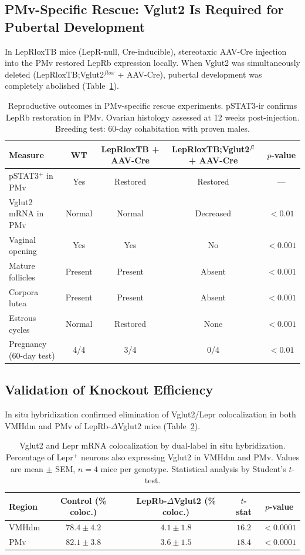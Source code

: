\documentclass[11pt]{article}
\begin{document}
\subsection{PMv-Specific Rescue: Vglut2 Is Required for Pubertal Development}

In LepRloxTB mice (LepR-null, Cre-inducible), stereotaxic AAV-Cre injection into the PMv restored LepRb expression locally. When Vglut2 was simultaneously deleted (LepRloxTB;Vglut2$^{flox}$ + AAV-Cre), pubertal development was completely abolished (Table~\ref{tab:rescue}).

\begin{table}[H]
\centering
\caption{Reproductive outcomes in PMv-specific rescue experiments. pSTAT3-ir confirms LepRb restoration in PMv. Ovarian histology assessed at 12 weeks post-injection. Breeding test: 60-day cohabitation with proven males.}
\label{tab:rescue}
\begin{tabular}{lcccc}
\toprule
\textbf{Measure} & \textbf{WT} & \textbf{LepRloxTB + AAV-Cre} & \textbf{LepRloxTB;Vglut2$^{fl}$ + AAV-Cre} & \textbf{$p$-value} \\
\midrule
pSTAT3$^+$ in PMv & Yes & Restored & Restored & --- \\
Vglut2 mRNA in PMv & Normal & Normal & Decreased & $< 0.01$ \\
Vaginal opening & Yes & Yes & No & $< 0.001$ \\
Mature follicles & Present & Present & Absent & $< 0.001$ \\
Corpora lutea & Present & Present & Absent & $< 0.001$ \\
Estrous cycles & Normal & Restored & None & $< 0.001$ \\
Pregnancy (60-day test) & 4/4 & 3/4 & 0/4 & $< 0.01$ \\
\bottomrule
\end{tabular}
\end{table}

\subsection{Validation of Knockout Efficiency}

In situ hybridization confirmed elimination of Vglut2/Lepr colocalization in both VMHdm and PMv of LepRb-$\Delta$Vglut2 mice (Table~\ref{tab:ish}).

\begin{table}[H]
\centering
\caption{Vglut2 and Lepr mRNA colocalization by dual-label in situ hybridization. Percentage of Lepr$^+$ neurons also expressing Vglut2 in VMHdm and PMv. Values are mean $\pm$ SEM, $n = 4$ mice per genotype. Statistical analysis by Student's $t$-test.}
\label{tab:ish}
\begin{tabular}{lcccc}
\toprule
\textbf{Region} & \textbf{Control (\% coloc.)} & \textbf{LepRb-$\Delta$Vglut2 (\% coloc.)} & \textbf{$t$-stat} & \textbf{$p$-value} \\
\midrule
VMHdm & $78.4 \pm 4.2$ & $4.1 \pm 1.8$ & $16.2$ & $< 0.0001$ \\
PMv & $82.1 \pm 3.8$ & $3.6 \pm 1.5$ & $18.4$ & $< 0.0001$ \\
\bottomrule
\end{tabular}
\end{table}
\end{document}
